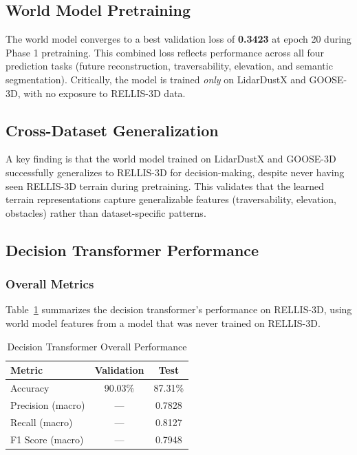 \documentclass[journal]{IEEEtran}
\begin{document}
\subsection{World Model Pretraining}

The world model converges to a best validation loss of \textbf{0.3423} at epoch 20 during Phase 1 pretraining. This combined loss reflects performance across all four prediction tasks (future reconstruction, traversability, elevation, and semantic segmentation). Critically, the model is trained \emph{only} on LidarDustX and GOOSE-3D, with no exposure to RELLIS-3D data.

\subsection{Cross-Dataset Generalization}

A key finding is that the world model trained on LidarDustX and GOOSE-3D successfully generalizes to RELLIS-3D for decision-making, despite never having seen RELLIS-3D terrain during pretraining. This validates that the learned terrain representations capture generalizable features (traversability, elevation, obstacles) rather than dataset-specific patterns.

\subsection{Decision Transformer Performance}

\subsubsection{Overall Metrics}
Table~\ref{tab:overall_results} summarizes the decision transformer's performance on RELLIS-3D, using world model features from a model that was never trained on RELLIS-3D.

\begin{table}[h]
\caption{Decision Transformer Overall Performance}
\label{tab:overall_results}
\centering
\begin{tabular}{lcc}
\toprule
Metric & Validation & Test \\
\midrule
Accuracy & 90.03\% & 87.31\% \\
Precision (macro) & --- & 0.7828 \\
Recall (macro) & --- & 0.8127 \\
F1 Score (macro) & --- & 0.7948 \\
\bottomrule
\end{tabular}
\end{table}
\end{document}
